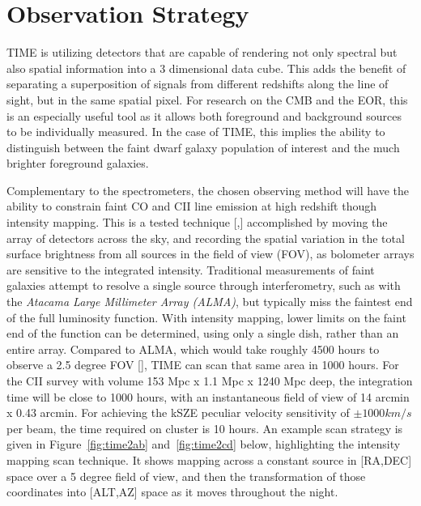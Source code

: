 \documentclass[manuscript]{aastex}
\begin{document}
\newpage
\section{\textbf{Observation Strategy}}

TIME is utilizing detectors that are capable of rendering not only spectral but also spatial information into a 3 dimensional data cube. This adds the benefit of separating a superposition of signals from different redshifts along the line of sight, but in the same spatial pixel. For research on the CMB and the EOR, this is an especially useful tool as it allows both foreground and background sources to be individually measured. In the case of TIME, this implies the ability to distinguish between the faint dwarf galaxy population of interest and the much brighter foreground galaxies. 

Complementary to the spectrometers, the chosen observing method will have the ability to constrain faint CO and CII line emission at high redshift though intensity mapping. This is a tested technique [\cite{Keating2015},\cite{Keating2016}] accomplished by moving the array of detectors across the sky, and recording the spatial variation in the total surface brightness from all sources in the field of view (FOV), as bolometer arrays are sensitive to the integrated intensity. Traditional measurements of faint galaxies attempt to resolve a single source through interferometry, such as with the \textit{Atacama Large Millimeter Array (ALMA)}, but typically miss the faintest end of the full luminosity function. With intensity mapping, lower limits on the faint end of the function can be determined, using only a single dish, rather than an entire array. Compared to ALMA, which would take roughly 4500 hours to observe a 2.5 degree FOV [\cite{Kovetz2017}], TIME can scan that same area in 1000 hours. For the CII survey with volume 153 Mpc x 1.1 Mpc x 1240 Mpc deep, the integration time will be close to 1000 hours, with an instantaneous field of view of 14 arcmin x 0.43 arcmin. For achieving the kSZE peculiar velocity sensitivity of $\pm 1000 km/s$ per beam, the time required on cluster is 10 hours. An example scan strategy is given in Figure~\ref{fig:time2ab} and~\ref{fig:time2cd} below, highlighting the intensity mapping scan technique. It shows mapping across a constant source in [RA,DEC] space over a 5 degree field of view, and then the transformation of those coordinates into [ALT,AZ] space as it moves throughout the night.
\end{document}
